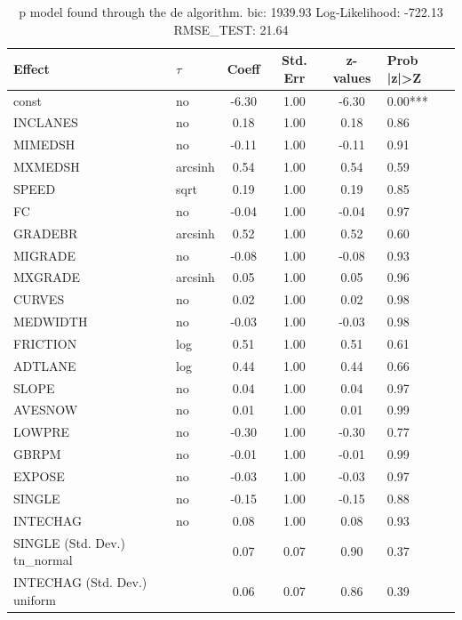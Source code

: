 \begin{table}
	\caption{p model found through the de algorithm. bic: 1939.93 Log-Likelihood: -722.13 RMSE_TEST: 21.64}
	\begin{center}
		\begin{tabular}{|l|l|c|c|c|l|}
			\hline
			Effect & $\tau$ & Coeff & Std. Err & z-values & Prob |z|>Z \\
			\hline
			const & no & -6.30 & 1.00 & -6.30 & 0.00*** \\
			\hline
			INCLANES & no & 0.18 & 1.00 & 0.18 & 0.86 \\
			\hline
			MIMEDSH & no & -0.11 & 1.00 & -0.11 & 0.91 \\
			\hline
			MXMEDSH & arcsinh & 0.54 & 1.00 & 0.54 & 0.59 \\
			\hline
			SPEED & sqrt & 0.19 & 1.00 & 0.19 & 0.85 \\
			\hline
			FC & no & -0.04 & 1.00 & -0.04 & 0.97 \\
			\hline
			GRADEBR & arcsinh & 0.52 & 1.00 & 0.52 & 0.60 \\
			\hline
			MIGRADE & no & -0.08 & 1.00 & -0.08 & 0.93 \\
			\hline
			MXGRADE & arcsinh & 0.05 & 1.00 & 0.05 & 0.96 \\
			\hline
			CURVES & no & 0.02 & 1.00 & 0.02 & 0.98 \\
			\hline
			MEDWIDTH & no & -0.03 & 1.00 & -0.03 & 0.98 \\
			\hline
			FRICTION & log & 0.51 & 1.00 & 0.51 & 0.61 \\
			\hline
			ADTLANE & log & 0.44 & 1.00 & 0.44 & 0.66 \\
			\hline
			SLOPE & no & 0.04 & 1.00 & 0.04 & 0.97 \\
			\hline
			AVESNOW & no & 0.01 & 1.00 & 0.01 & 0.99 \\
			\hline
			LOWPRE & no & -0.30 & 1.00 & -0.30 & 0.77 \\
			\hline
			GBRPM & no & -0.01 & 1.00 & -0.01 & 0.99 \\
			\hline
			EXPOSE & no & -0.03 & 1.00 & -0.03 & 0.97 \\
			\hline
			SINGLE & no & -0.15 & 1.00 & -0.15 & 0.88 \\
			\hline
			INTECHAG & no & 0.08 & 1.00 & 0.08 & 0.93 \\
			\hline
			SINGLE (Std. Dev.) tn_normal &  & 0.07 & 0.07 & 0.90 & 0.37 \\
			\hline
			INTECHAG (Std. Dev.) uniform &  & 0.06 & 0.07 & 0.86 & 0.39 \\
			\hline
		\end{tabular}
	\end{center}
\end{table}